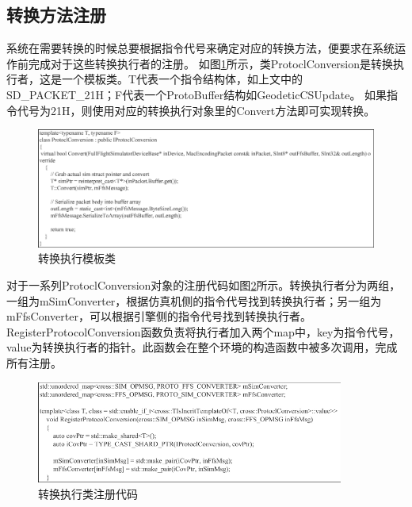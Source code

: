 \subsection{转换方法注册}
系统在需要转换的时候总要根据指令代号来确定对应的转换方法，便要求在系统运作前完成对于这些转换执行者的注册。
如图\ref{convtmp}所示，类ProtoclConversion是转换执行者，这是一个模板类。T代表一个指令结构体，如上文中的SD\_PACKET\_21H；F代表一个ProtoBuffer结构如GeodeticCSUpdate。
如果指令代号为21H，则使用对应的转换执行对象里的Convert方法即可实现转换。
\begin{figure}[h!]
    \begin{center}
        \includegraphics[width=\textwidth]{pictures/code13.pdf}
        \caption{转换执行模板类}
        \label{convtmp}
    \end{center}
\end{figure}
\par
对于一系列ProtoclConversion对象的注册代码如图\ref{regiconv}所示。转换执行者分为两组，一组为mSimConverter，根据仿真机侧的指令代号找到转换执行者；另一组为mFfsConverter，可以根据引擎侧的指令代号找到转换执行者。
RegisterProtocolConversion函数负责将执行者加入两个map中，key为指令代号，value为转换执行者的指针。此函数会在整个环境的构造函数中被多次调用，完成所有注册。
\begin{figure}[h!]
    \begin{center}
        \includegraphics[width=0.9\textwidth]{pictures/code14.pdf}
        \caption{转换执行类注册代码}
        \label{regiconv}
    \end{center}
\end{figure}
